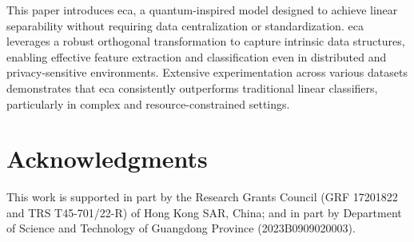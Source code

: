 \documentclass[lettersize,journal]{IEEEtran}
\begin{document}
This paper introduces \gls{eca}, a quantum-inspired model designed to achieve linear separability without requiring data centralization or standardization. \gls{eca} leverages a robust orthogonal transformation to capture intrinsic data structures, enabling effective feature extraction and classification even in distributed and privacy-sensitive environments. Extensive experimentation across various datasets demonstrates that \gls{eca} consistently outperforms traditional linear classifiers,
particularly in complex and resource-constrained settings.

\section*{Acknowledgments}
This work is supported in part by the Research Grants Council (GRF 17201822 and TRS T45-701/22-R) of Hong Kong SAR, China; and in part by Department of Science
and Technology of Guangdong Province (2023B0909020003).



\vfill
\end{document}
